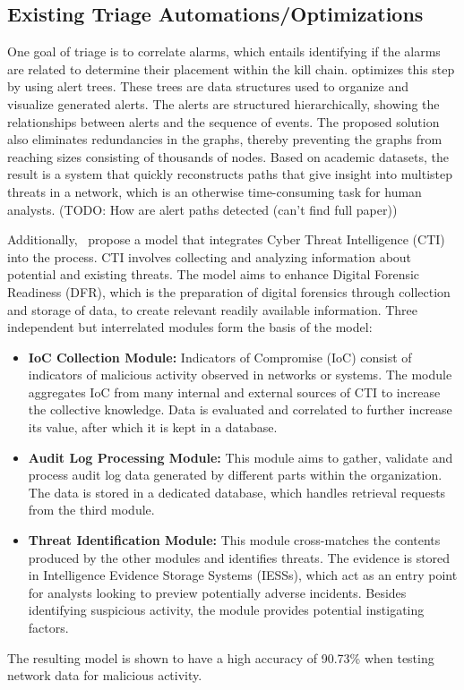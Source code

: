 \subsection{Existing Triage Automations/Optimizations}
\label{subsec:rq1-existing-optimizations}

One goal of triage is to correlate alarms, which entails identifying if the alarms are related to determine their
placement within the kill chain.
\citet{ficke2022reconstructing} optimizes this step by using alert trees.
These trees are data structures used to organize and visualize generated alerts.
The alerts are structured hierarchically, showing the relationships between alerts and the sequence of events.
The proposed solution also eliminates redundancies in the graphs, thereby preventing the graphs from reaching sizes
consisting of thousands of nodes.
Based on academic datasets, the result is a system that quickly reconstructs paths that give insight into multistep
threats in a network, which is an otherwise time-consuming task for human analysts.
(TODO: How are alert paths detected (can't find full paper)) %

Additionally,\ \citet{serketzis2019improving} propose a model that integrates Cyber Threat Intelligence (CTI) into the
process.
CTI involves collecting and analyzing information about potential and existing threats.
The model aims to enhance Digital Forensic Readiness (DFR), which is the preparation of digital forensics through
collection and storage of data, to create relevant readily available information.
Three independent but interrelated modules form the basis of the model:
\begin{itemize}
    \item \textbf{IoC Collection Module:}
    Indicators of Compromise (IoC) consist of indicators of malicious activity observed in networks or systems.
    The module aggregates IoC from many internal and external sources of CTI to increase the collective knowledge.
    Data is evaluated and correlated to further increase its value, after which it is kept in a database.

    \item \textbf{Audit Log Processing Module:}
    This module aims to gather, validate and process audit log data generated by different parts within the
    organization.
    The data is stored in a dedicated database, which handles retrieval requests from the third module.

    \item \textbf{Threat Identification Module:}
    This module cross-matches the contents produced by the other modules and identifies threats.
    The evidence is stored in Intelligence Evidence Storage Systems (IESSs), which act as an entry point for analysts
    looking to preview potentially adverse incidents.
    Besides identifying suspicious activity, the module provides potential instigating factors.
\end{itemize}
The resulting model is shown to have a high accuracy of 90.73\% when testing network data for malicious activity.

